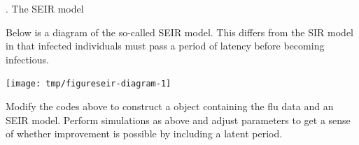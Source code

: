 \begin{frame}{\myexercise. The SEIR model}

  Below is a diagram of the so-called SEIR model.
  This differs from the SIR model in that infected individuals must pass a period of latency before becoming infectious.


\begin{knitrout}\small
{}\color{fgcolor}

{\centering \texttt{[image: tmp/figureseir-diagram-1]} 

}



\end{knitrout}
  
  Modify the codes above to construct a  object containing the flu data and an SEIR model.
  Perform simulations as above and adjust parameters to get a sense of whether improvement is possible by including a latent period.

  \vspace{3mm}


\end{frame} 



